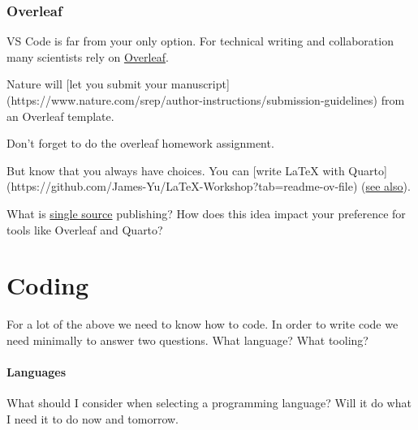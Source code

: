 \documentclass[
  letterpaper,
  DIV=11,
  numbers=noendperiod]{scrreprt}
\begin{document}
\subsection{Overleaf}\label{overleaf}

VS Code is far from your only option. For technical writing and
collaboration many scientists rely on
\href{https://www.overleaf.com}{Overleaf}.

Nature will {[}let you submit your
manuscript{]}(https://www.nature.com/srep/author-instructions/submission-guidelines)
from an Overleaf template.

Don't forget to do the overleaf homework assignment.

But know that you always have choices. You can {[}write LaTeX with
Quarto{]}(https://github.com/James-Yu/LaTeX-Workshop?tab=readme-ov-file)
(\href{https://mark-wang.com/blog/2022/latex/}{see also}).

\begin{tcolorbox}[enhanced jigsaw, opacityback=0, leftrule=.75mm, colback=white, left=2mm, titlerule=0mm, toprule=.15mm, toptitle=1mm, coltitle=black, title=\textcolor{quarto-callout-tip-color}{\faLightbulb}\hspace{0.5em}{Classroom Discussion}, opacitybacktitle=0.6, colbacktitle=quarto-callout-tip-color!10!white, breakable, bottomrule=.15mm, bottomtitle=1mm, colframe=quarto-callout-tip-color-frame, arc=.35mm, rightrule=.15mm]

What is
\href{https://coko.foundation/articles/single-source-publishing.html}{single
source} publishing? How does this idea impact your preference for tools
like Overleaf and Quarto?

\end{tcolorbox}


\chapter{Coding}\label{coding}

For a lot of the above we need to know how to code. In order to write
code we need minimally to answer two questions. What language? What
tooling?

\subsubsection{Languages}\label{languages}

What should I consider when selecting a programming language? Will it do
what I need it to do now and tomorrow.
\end{document}
